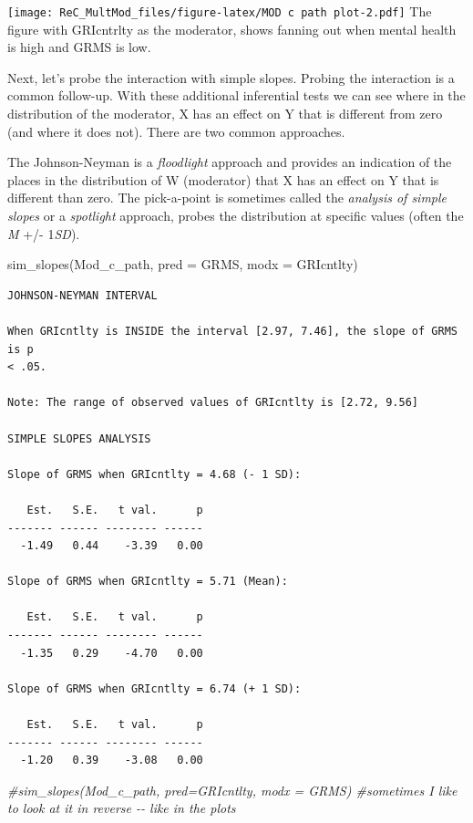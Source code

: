 \documentclass[
]{book}
\newenvironment{Shaded}{\begin{snugshade}}{\end{snugshade}}
\newcommand{\AttributeTok}[1]{\textcolor[rgb]{0.77,0.63,0.00}{#1}}
\newcommand{\CommentTok}[1]{\textcolor[rgb]{0.56,0.35,0.01}{\textit{#1}}}
\newcommand{\FunctionTok}[1]{\textcolor[rgb]{0.00,0.00,0.00}{#1}}
\newcommand{\NormalTok}[1]{#1}
\begin{document}
\texttt{[image: ReC\_MultMod\_files/figure-latex/MOD c path plot-2.pdf]}
The figure with GRIcntrlty as the moderator, shows fanning out when mental health is high and GRMS is low.

Next, let's probe the interaction with simple slopes. Probing the interaction is a common follow-up. With these additional inferential tests we can see where in the distribution of the moderator, X has an effect on Y that is different from zero (and where it does not). There are two common approaches.

The Johnson-Neyman is a \emph{floodlight} approach and provides an indication of the places in the distribution of W (moderator) that X has an effect on Y that is different than zero. The pick-a-point is sometimes called the \emph{analysis of simple slopes} or a \emph{spotlight} approach, probes the distribution at specific values (often the \emph{M} +/- 1\emph{SD}).

\begin{Shaded}
\begin{Highlighting}[]
\FunctionTok{sim\_slopes}\NormalTok{(Mod\_c\_path, }\AttributeTok{pred =}\NormalTok{ GRMS, }\AttributeTok{modx =}\NormalTok{ GRIcntlty)}
\end{Highlighting}
\end{Shaded}

\begin{verbatim}
JOHNSON-NEYMAN INTERVAL 

When GRIcntlty is INSIDE the interval [2.97, 7.46], the slope of GRMS is p
< .05.

Note: The range of observed values of GRIcntlty is [2.72, 9.56]

SIMPLE SLOPES ANALYSIS 

Slope of GRMS when GRIcntlty = 4.68 (- 1 SD): 

   Est.   S.E.   t val.      p
------- ------ -------- ------
  -1.49   0.44    -3.39   0.00

Slope of GRMS when GRIcntlty = 5.71 (Mean): 

   Est.   S.E.   t val.      p
------- ------ -------- ------
  -1.35   0.29    -4.70   0.00

Slope of GRMS when GRIcntlty = 6.74 (+ 1 SD): 

   Est.   S.E.   t val.      p
------- ------ -------- ------
  -1.20   0.39    -3.08   0.00
\end{verbatim}

\begin{Shaded}
\begin{Highlighting}[]
\CommentTok{\#sim\_slopes(Mod\_c\_path, pred=GRIcntlty, modx = GRMS) \#sometimes I like to look at it in reverse {-}{-} like in the plots}
\end{Highlighting}
\end{Shaded}
\end{document}

